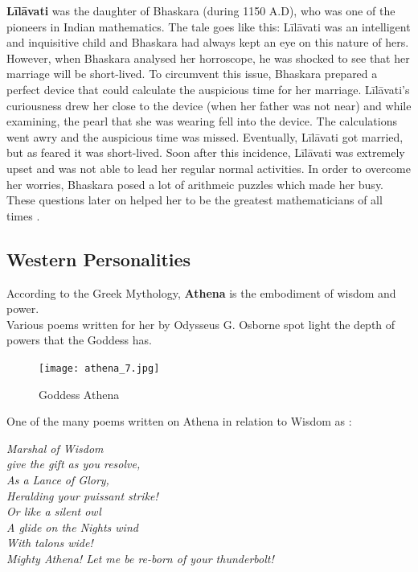 \documentclass[a4paper,10pt]{article}
\begin{document}
\textbf{L\={i}l\={a}vati} was the daughter of Bhaskara (during 1150 A.D), who was one of the pioneers in Indian mathematics. The tale goes like this: L\={i}l\={a}vati was an intelligent and inquisitive child and Bhaskara had always kept an eye on this nature of hers. However, when Bhaskara analysed her horroscope, he was shocked to see that her marriage will be short-lived. To circumvent this issue, Bhaskara prepared a perfect device that could calculate the auspicious time for her marriage. L\={i}l\={a}vati's curiousness drew her close to the device (when her father was not near) and while examining, the pearl that she was wearing fell into the device. The calculations went awry and the auspicious time was missed. Eventually, L\={i}l\={a}vati got married, but as feared it was short-lived. Soon after this incidence, L\={i}l\={a}vati was extremely upset and was not able to lead her regular normal activities. In order to overcome her worries, Bhaskara posed a lot of arithmeic puzzles which made her busy. These questions later on helped her to be the 
greatest mathematicians of all times \cite{lilavati}. 

\subsection{Western Personalities}
\newblock
According to the Greek Mythology, \textbf{Athena} is the embodiment of wisdom and power.\\
Various poems written for her by Odysseus G. Osborne spot light the depth of powers that the Goddess has.\\
\begin{center}
\begin{figure}[h]
\centering
 \texttt{[image: athena\_7.jpg]}
 \caption{Goddess Athena}
\end{figure}
\end{center}

One of the many poems written on Athena in relation to Wisdom as \cite{athena}:\\
\begin{center}
\textit{Marshal of Wisdom}\\
\textit{give the gift as you resolve,}\\
\textit{As a Lance of Glory,}\\
\textit{Heralding your puissant strike!}\\
\textit{Or like a silent owl}\\
\textit{A glide on the Nights wind}\\
\textit{With talons wide!}\\
\textit{Mighty Athena! Let me be re-born of your thunderbolt!}\\
\end{center}
\end{document}
